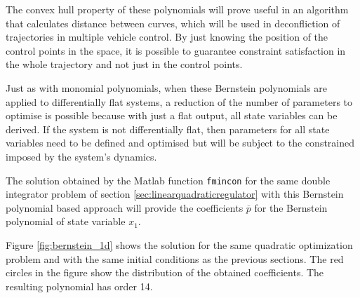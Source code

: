 

The convex hull property of these polynomials will prove useful in an algorithm that calculates distance between curves, which will be used in deconfliction of trajectories in multiple vehicle control. By just knowing the position of the control points in the space, it is possible to guarantee constraint satisfaction in the whole trajectory and not just in the control points.

\par Just as with monomial polynomials, when these Bernstein polynomials are applied to differentially flat systems, a reduction of the number of parameters to optimise is possible because with just a flat output, all state variables can be derived. If the system is not differentially flat, then parameters for all state variables need to be defined and optimised but will be subject to the constrained imposed by the system's dynamics.

\par The solution obtained by the Matlab function \texttt{fmincon} for the same double integrator problem of section \ref{sec:linearquadraticregulator} with this Bernstein polynomial based approach will provide the coefficients $\overline{p}$ for the Bernstein polynomial of state variable $x_1$. 

\par Figure \ref{fig:bernstein_1d} shows the solution for the same quadratic optimization problem and with the same initial conditions as the previous sections. The red circles in the figure show the distribution of the obtained coefficients. The resulting polynomial has order 14.


